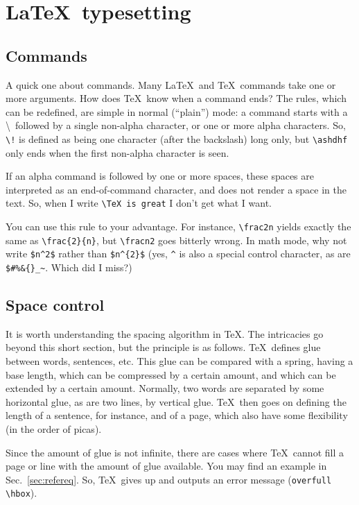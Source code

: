 \documentclass{article}
\begin{document}
\section{\LaTeX\ typesetting}
\subsection{Commands}
A quick one about commands.  Many \LaTeX\ and \TeX\ commands take one or more 
arguments. How does \TeX\ know when a command ends? The rules, which can be
redefined, are simple in normal (``plain'') mode:
	a command starts with a \textbackslash\ followed by a single
  	non-alpha character, or one or more alpha characters.  So,
	\verb+\!+ is defined as being one character (after the backslash)
	long only, but \verb+\ashdhf+ only ends when the first non-alpha
	character is seen.

If an alpha command is followed by one or more spaces, these spaces are interpreted as an end-of-command character, and does not render a space in the text.  So, when I write \verb+\TeX is great+ I don't get what I want.

You can use this rule to your advantage.  For instance, \verb+\frac2n+ yields exactly the same as \verb+\frac{2}{n}+, but \verb+\fracn2+ goes bitterly wrong.  In math mode, why not write \verb+$n^2$+ rather than \verb+$n^{2}$+ (yes, \verb+^+ is also a special control character, as are \verb+$#%&{}_~+.  Which did I miss?)
 
\subsection{Space control}
It is worth understanding the spacing algorithm in \TeX. The intricacies go beyond this short section, but the principle is as follows.  \TeX\ defines glue between words, sentences, etc.  This glue can be compared with a spring, having a base length, which can be compressed by a certain amount, and which can be extended by a certain amount.  Normally, two words are separated by some  horizontal glue, as are two lines, by vertical glue.  \TeX\ then goes on defining the length of a sentence, for instance, and of a page, which also have some flexibility (in the order of picas).

Since the amount of glue is not infinite, there are cases where \TeX\ cannot fill a page or line with the amount of glue available.  You may find an example in Sec.~\ref{sec:refereq}.  So, \TeX\ gives up and outputs an error message (\verb+overfull \hbox+).
\end{document}
